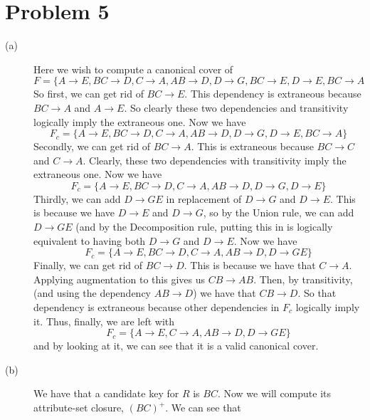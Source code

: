 \documentclass{article}
\begin{document}
\section*{Problem 5}
\begin{description}
    \item[(a)] Here we wish to compute a canonical cover of
        \[ F = \{ A \rightarrow E, BC \rightarrow D, C \rightarrow A,
        AB \rightarrow D, D \rightarrow G, BC \rightarrow E, D \rightarrow E,
        BC \rightarrow A \]
        So first, we can get rid of $BC \rightarrow E$. This dependency is
        extraneous because $BC \rightarrow A$ and $A \rightarrow E$. So clearly
        these two dependencies and transitivity logically imply the extraneous
        one. Now we have
        \[ F_c = \{ A \rightarrow E, BC \rightarrow D, C \rightarrow A,
        AB \rightarrow D, D \rightarrow G, D \rightarrow E, BC \rightarrow A\} \]
        Secondly, we can get rid of $BC \rightarrow A$. This is extraneous
        because $BC \rightarrow C$ and $C \rightarrow A$. Clearly, these
        two dependencies with transitivity imply the extraneous one.
        Now we have
        \[ F_c = \{ A \rightarrow E, BC \rightarrow D, C \rightarrow A,
        AB \rightarrow D, D \rightarrow G, D \rightarrow E\} \]
        Thirdly, we can add $D \rightarrow GE$ in replacement of
        $D \rightarrow G$ and $D \rightarrow E$. This is because we have
        $D \rightarrow E$ and $D \rightarrow G$, so by the Union rule, we can
        add $D \rightarrow GE$ (and by the Decomposition rule, putting this in
        is logically equivalent to having both $D \rightarrow G$ and
        $D \rightarrow E$. Now we have
        \[ F_c = \{ A \rightarrow E, BC \rightarrow D, C \rightarrow A,
        AB \rightarrow D, D \rightarrow GE \} \]
        Finally, we can get rid of $BC \rightarrow D$. This is because we
        have that $C \rightarrow A$. Applying augmentation to this gives us
        $CB \rightarrow AB$. Then, by transitivity, (and using the dependency
        $AB \rightarrow D$) we have that $CB \rightarrow D$. So that dependency
        is extraneous because other dependencies in $F_c$ logically imply it.
        Thus, finally, we are left with
        \[ F_c = \{ A \rightarrow E, C \rightarrow A, AB \rightarrow D,
        D \rightarrow GE \} \]
        and by looking at it, we can see that it is a valid canonical cover.
    \item[(b)] We have that a candidate key for $R$ is $BC$. Now we will
        compute its attribute-set closure, $(BC)^+$. We can see that

\end{description}
\end{document}
